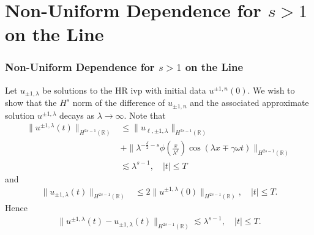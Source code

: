 \documentclass{beamer}
\newcommand{\rr}{\mathbb{R}}
\begin{document}
\section{Non-Uniform Dependence for $s>1$ on the Line}
\begin{frame}
	\frametitle{Non-Uniform Dependence for $s>1$ on the Line}

Let $u_{\pm 1,\lambda}$ be solutions to the HR ivp with initial 
data $u^{\pm 1,
n}(0)$. We wish to show that the $H^s$ norm of the difference of $u_{\pm 1,
n}$ and the associated approximate solution $u^{\pm 1,\lambda}$
decays as $\lambda \to \infty$. Note that
\pause
%
%
\begin{equation*}
\begin{split}
\label{apple62}
 \|u^{\pm 1, \lambda}(t)\|_{H^{2s-1}(\rr)}
 & \le \|u_{\ell, \pm 1, \lambda}\|_{H^{2s-1}(\rr)}
\\
& +
\| \lambda^{-\frac{\delta}{2} -s} \phi \left(
\frac{x}{\lambda^\delta} \right) \cos(\lambda x \mp \gamma \omega t)
\|_{H^{2s-1}(\rr)}
\\
& \lesssim \lambda^{s-1}, \quad |t| \le T
\end{split}
\end{equation*}
%
%
and
%
\begin{equation*}
\begin{split}
\|u_{\pm 1,\lambda} (t) \|_{H^{2s-1}(\rr)}
& \le 2 \|u^{\pm 1,\lambda}(0) \|_{H^{2s-1}(\rr)}, \quad
|t| \le T.
\label{apple60}
\end{split}
\end{equation*}
%
%
%
%
\pause
Hence
%
\begin{equation*}
\begin{split}
\|u^{\pm 1, \lambda}(t) - u_{\pm 1, \lambda}(t) \|_{H^{2s-1}(\rr)}
\lesssim \lambda^{s-1}, \quad |t| \le T.
\label{apple63}
\end{split}
\end{equation*}
%
%
\end{frame}
\end{document}
